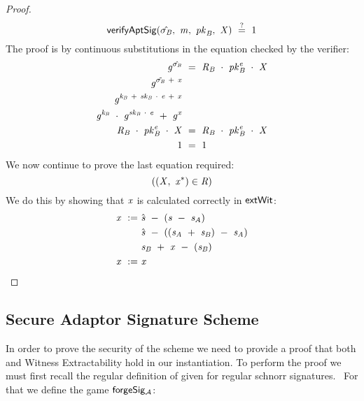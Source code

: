 \begin{proof}
    \[
        \mathsf{verifyAptSig}(\hat{\sigma_{\mathit{B}}} ,~ \mathit{m} ,~ \mathit{pk}_{\mathit{B}} ,~ \mathit{X}) ~\stackrel{?}{=}~ 1
    \]
    The proof is by continuous substitutions in the equation checked by the verifier:
    \begin{align}
        \mathit{g}^{\hat{\sigma_{\mathit{B}}}} &~=~ \mathit{R}_{\mathit{B}} ~\cdot~ \mathit{pk}_{\mathit{B}}^{\mathit{e}} ~\cdot~ \mathit{X} \\
        \mathit{g}^{\tilde{\sigma_{\mathit{B}}} ~+~ \mathit{x}} & \\
        \mathit{g}^{\mathit{\mathit{k}_{\mathit{B}}} ~+~ \mathit{sk}_{\mathit{B}} ~\cdot~ \mathit{e} ~+~ \mathit{x}} & \\
        \mathit{g}^{\mathit{\mathit{k}_{\mathit{B}}}} ~\cdot~ \mathit{g}^{\mathit{sk}_{\mathit{B}} ~\cdot~ \mathit{e}} ~+~ \mathit{g}^{\mathit{x}} & \\
        \mathit{R}_{\mathit{B}} ~\cdot~ \mathit{pk}_{\mathit{B}}^{\mathit{e}} ~\cdot~ \mathit{X} &~=~ \mathit{R}_{\mathit{B}} ~\cdot~ \mathit{pk}_{\mathit{B}}^{\mathit{e}} ~\cdot~ \mathit{X} \\
        1 &~=~ 1
    \end{align}
    We now continue to prove the last equation required:
    \[
        ((\mathit{X} ,~ \mathit{x}^*) \in \mathit{R})
    \]
    We do this by showing that $\mathit{x}$ is calculated correctly in $\mathsf{extWit}$:
    \begin{align}
        \mathit{x} ~:=~ & \hat{\mathit{s}} ~-~ (\mathit{s} ~-~ \mathit{s}_{\mathit{A}}) \\
        & \hat{\mathit{s}} ~-~ ((\mathit{s}_{\mathit{A}} ~+~ \mathit{s}_{\mathit{B}} ) ~-~ \mathit{s}_{\mathit{A}} ) \\
        & \mathit{s}_{\mathit{B}} ~+~ \mathit{x} ~-~ (\mathit{s}_{\mathit{B}}) \\
        \mathit{x} ~:=~ & \mathit{x} \\
    \end{align}
\end{proof}

\subsection{Secure Adaptor Signature Scheme}\label{subsec:sig:secureaptscheme}

In order to prove the security of the scheme we need to provide a proof that both \cnstaEUFCMA and Witness Extractability hold in our instantiation.
To perform the proof we must first recall the regular definition of \cnstEUFCMA given for regular schnorr signatures.~\cite{schnorr1989efficient} For that we define the game $\mathsf{forgeSig_{\mathcal{A}}}$:

